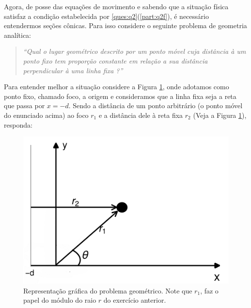 \documentclass[]{IMTexam}
\begin{document}
\begin{questions}
	\question \label{ques:q3} Agora, de posse das equações de movimento e sabendo que a situação física satisfaz a condição estabelecida por \ref{ques:q2}(\ref{part:q2f}), é necessário entendermos seções cônicas. Para isso considere o seguinte problema de geometria analítica:
	\begin{quotation}
		\itshape ``Qual o lugar geométrico descrito por um ponto móvel cuja distância à um ponto fixo tem proporção constante em relação a sua distância perpendicular à uma linha fixa ?''
	\end{quotation}
	Para entender melhor a situação considere a Figura \ref{fig:fig3}, onde adotamos como ponto fixo, chamado foco, a origem e consideramos que a linha fixa seja a reta que passa por $ x = -d $. Sendo a distância de um ponto arbitrário (o ponto móvel do enunciado acima) ao foco $ r_1 $ e a distância dele à reta fixa $ r_2 $ (Veja a Figura \ref{fig:fig3}), responda:

	\begin{figure}[H]
		\centering
		\includegraphics[width=0.5\linewidth]{screenshot003}
		\caption{Representação gráfica do problema geométrico. Note que $ r_1 $, faz o papel do módulo do raio $ r $ do exercício anterior.}
		\label{fig:fig3}
	\end{figure}

\end{questions}
\end{document}
